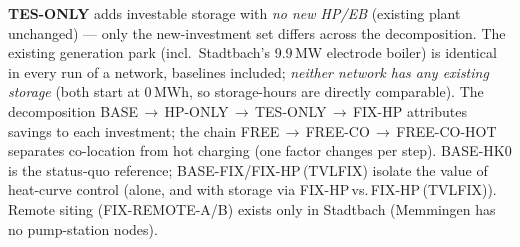 \begin{table}[t]
\vspace{2pt}
{\footnotesize \textbf{TES-ONLY} adds investable storage with \emph{no new HP/EB}
(existing plant unchanged) — only the new-investment set differs across the
decomposition. The existing generation park (incl.\ Stadtbach's 9.9\,MW electrode
boiler) is identical in every run of a network, baselines included; \emph{neither
network has any existing storage} (both start at 0\,MWh, so storage-hours are directly
comparable). The decomposition BASE\,$\to$\,HP-ONLY\,$\to$\,TES-ONLY\,$\to$\,FIX-HP
attributes savings to each investment; the chain FREE\,$\to$\,FREE-CO\,$\to$\,FREE-CO-HOT
separates co-location from hot charging (one factor changes per step). BASE-HK0 is the
status-quo reference; BASE-FIX/FIX-HP\,(TVLFIX) isolate the value of heat-curve control
(alone, and with storage via FIX-HP\,vs.\,FIX-HP\,(TVLFIX)). Remote siting (FIX-REMOTE-A/B)
exists only in Stadtbach (Memmingen has no pump-station nodes).}
\end{table}
